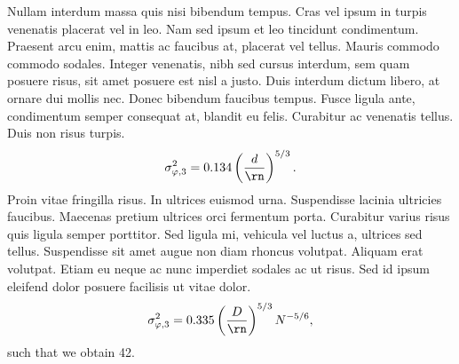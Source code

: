Nullam interdum massa quis nisi bibendum tempus. Cras vel ipsum in turpis venenatis placerat vel in leo. Nam sed ipsum et leo tincidunt condimentum. Praesent arcu enim, mattis ac faucibus at, placerat vel tellus. Mauris commodo commodo sodales. Integer venenatis, nibh sed cursus interdum, sem quam posuere risus, sit amet posuere est nisl a justo. Duis interdum dictum libero, at ornare dui mollis nec. Donec bibendum faucibus tempus. Fusce ligula ante, condimentum semper consequat at, blandit eu felis. Curabitur ac venenatis tellus. Duis non risus turpis. 
\begin{equation}
	\label{eqn:3}
	\sigma_{\varphi, 3}^2 = 0.134 \left ( \frac{d}{\rn} \right )^{5/3}.
\end{equation}
Proin vitae fringilla risus. In ultrices euismod urna. Suspendisse lacinia ultricies faucibus. Maecenas pretium ultrices orci fermentum porta. Curabitur varius risus quis ligula semper porttitor. Sed ligula mi, vehicula vel luctus a, ultrices sed tellus. Suspendisse sit amet augue non diam rhoncus volutpat. Aliquam erat volutpat. Etiam eu neque ac nunc imperdiet sodales ac ut risus. Sed id ipsum eleifend dolor posuere facilisis  ut vitae dolor. 
\begin{equation}
	\label{eqn:4}
	\sigma_{\varphi, 3}^2 = 0.335 \left ( \frac{D}{\rn} \right )^{5/3} N^{-5/6},
\end{equation}
such that we obtain 42.
